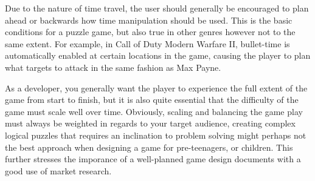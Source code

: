Due to the nature of time travel, the user should generally be encouraged to plan ahead or backwards how time manipulation should be used. This is the basic conditions for a puzzle game, but also true in other genres however not to the same extent. For example, in Call of Duty Modern Warfare II, bullet-time is automatically enabled at certain locations in the game, causing the player to plan what targets to attack in the same fashion as Max Payne. 

As a developer, you generally want the player to experience the full extent of the game from start to finish, but it is also quite essential that the difficulty of the game must scale well over time. Obviously, scaling and balancing the game play must always be weighted in regards to your target audience, creating complex logical puzzles that requires an inclination to problem solving might perhaps not the best approach when designing a game for pre-teenagers, or children. This further stresses the imporance of a well-planned game design documents with a good use of market research. 





